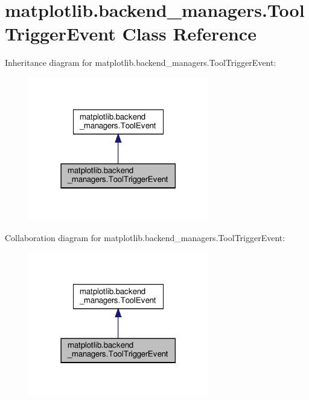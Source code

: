 \hypertarget{classmatplotlib_1_1backend__managers_1_1ToolTriggerEvent}{}\section{matplotlib.\+backend\+\_\+managers.\+Tool\+Trigger\+Event Class Reference}
\label{classmatplotlib_1_1backend__managers_1_1ToolTriggerEvent}


Inheritance diagram for matplotlib.\+backend\+\_\+managers.\+Tool\+Trigger\+Event\+:
\nopagebreak
\begin{figure}[H]
\begin{center}
\leavevmode
\includegraphics[width=222pt]{classmatplotlib_1_1backend__managers_1_1ToolTriggerEvent__inherit__graph}
\end{center}
\end{figure}


Collaboration diagram for matplotlib.\+backend\+\_\+managers.\+Tool\+Trigger\+Event\+:
\nopagebreak
\begin{figure}[H]
\begin{center}
\leavevmode
\includegraphics[width=222pt]{classmatplotlib_1_1backend__managers_1_1ToolTriggerEvent__coll__graph}
\end{center}
\end{figure}
